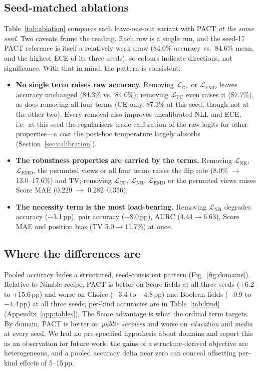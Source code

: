 \documentclass[conference]{IEEEtran}
\newcommand{\Lcf}{\mathcal{L}_{\mathrm{CF}}}
\newcommand{\Lpc}{\mathcal{L}_{\mathrm{PC}}}
\newcommand{\Lnr}{\mathcal{L}_{\mathrm{NR}}}
\newcommand{\Lemd}{\mathcal{L}_{\mathrm{EMD}}}
\newcommand{\run}[1]{#1}
\begin{document}
\subsection{Seed-matched ablations}
\label{sec:ablation}
Table~\ref{tab:ablation} compares each leave-one-out variant with PACT
\emph{at the same seed}. Two caveats frame the reading. Each row is a single
run, and the seed-17 PACT reference is itself a relatively weak draw
(84.0\% accuracy vs.\ 84.6\% mean, and the highest ECE of its three seeds), so
colours indicate directions, not significance. With that in mind, the pattern
is consistent:
\begin{itemize}
\item \textbf{No single term raises raw accuracy.} Removing $\Lcf$ or $\Lemd$
  leaves accuracy unchanged (84.3\% vs.\ 84.0\%); removing $\Lpc$ even raises
  it (87.7\%), as does removing all four terms (\run{CE-only}, 87.3\% at this
  seed, though not at the other two). Every removal also improves uncalibrated
  NLL and ECE, i.e.\ at this seed the regularisers trade
  calibration of the raw logits for other properties---a cost the post-hoc
  temperature largely absorbs (Section~\ref{sec:calibration}).
\item \textbf{The robustness properties are carried by the terms.} Removing
  $\Lnr$, $\Lemd$, the permuted views or all four terms raises the flip rate
  (8.0\% $\to$ 13.0--17.6\%) and TV; removing $\Lcf$, $\Lnr$, $\Lemd$ or the
  permuted views raises Score MAE (0.229 $\to$ 0.282--0.356).
\item \textbf{The necessity term is the most load-bearing.} Removing $\Lnr$
  degrades accuracy ($-$3.1\,pp), pair accuracy ($-$8.0\,pp), AURC
  (4.44$\to$6.63), Score MAE and position bias (TV 5.0$\to$11.7\%) at once.
\end{itemize}

\subsection{Where the differences are}
\label{sec:where}
Pooled accuracy hides a structured, seed-consistent pattern
(Fig.~\ref{fig:domains}). Relative to \run{Nimble recipe}, PACT is better on
Score fields at all three seeds (+6.2 to +15.6\,pp) and worse on Choice
($-$3.4 to $-$4.8\,pp) and Boolean fields ($-$0.9 to $-$4.4\,pp) at all three
seeds; per-kind accuracies are in Table~\ref{tab:kind}
(Appendix~\ref{app:tables}). The Score advantage is what the ordinal term
targets. By domain, PACT is better on \emph{public services} and worse on
\emph{education} and \emph{media} at every seed. We had no pre-specified
hypothesis about domains and report this as an observation for future work:
the gains of a structure-derived objective are heterogeneous, and a pooled
accuracy delta near zero can conceal offsetting per-kind effects of 5--15\,pp.
\end{document}
